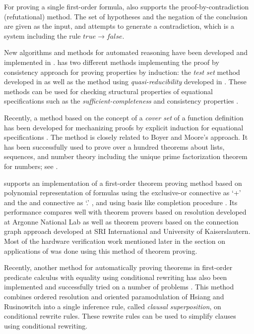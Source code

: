 For proving a single first-order formula, \RRL also supports the
proof-by-contradiction (refutational) method. The set of hypotheses
and the negation of the conclusion are given as the input, and \RRL
attempts to generate a contradiction, which is a system including the
rule $true \rightarrow false$.

New algorithms and methods for automated reasoning have been developed
and implemented in \ERRL.  \RRL has two different methods implementing
the proof by consistency approach for proving
properties by induction: the {\sl test set} method developed in
\cite{KNZ861} as well as the method using {\sl quasi-reducibility}
developed in \cite{JK86}.  These methods can be used for checking
structural properties of equational specifications such as the {\sl
sufficient-completeness} \cite{KNZ85} and consistency properties
\cite{Musser80,KM84}.
 
Recently, a method based on the concept of a {\it cover set} of a
function definition has been developed for mechanizing proofs by
explicit induction for equational specifications \cite{ZKM}.  The
method is closely related to Boyer and Moore's approach.  It
has been successfully used to prove over a hundred theorems about
lists, sequences, and number theory including the unique prime
factorization theorem for numbers; see \cite{ZKM}.
 
\RRL supports an implementation of a first-order theorem proving method
based on polynomial representation of formulas using the exclusive-or
connective as `+' and the and connective as `.' \cite{Hsiang85}, and
using \Groebner basis like completion procedure \cite{KN85}.  Its
performance compares well with theorem provers based on resolution
developed at Argonne National Lab as well as theorem provers based on
the connection graph approach developed at SRI International and University of
Kaiserslautern. Most of the hardware verification work mentioned later
in the section on applications of \RRL was done using this method of
theorem proving.
 
Recently, another method for automatically proving theorems in
first-order predicate calculus with equality using conditional
rewriting has also been implemented and successfully tried on a number
of problems \cite{ZK881}.  This method combines ordered resolution and
oriented paramodulation of Hsiang and Rusinowitch \cite{HR87} into a
single inference rule, called {\it clausal superposition}, on
conditional rewrite rules. These rewrite rules can be used to simplify clauses
using conditional rewriting.
 
